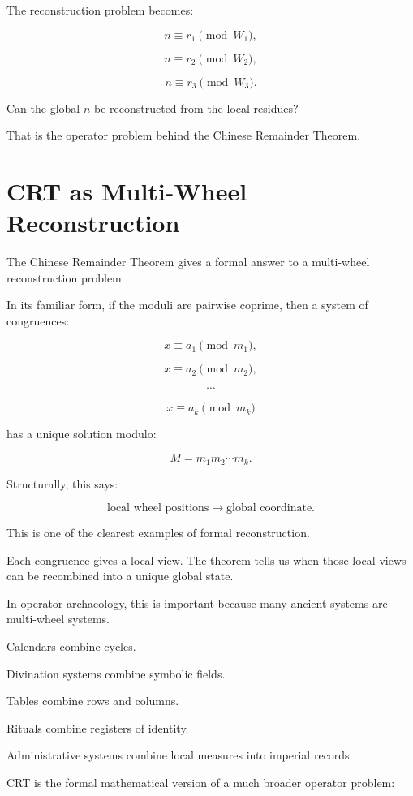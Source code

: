 \documentclass[11pt]{book}
\begin{document}
The reconstruction problem becomes:

\[
n \equiv r_1 \pmod{W_1},
\]

\[
n \equiv r_2 \pmod{W_2},
\]

\[
n \equiv r_3 \pmod{W_3}.
\]

Can the global \(n\) be reconstructed from the local residues?

That is the operator problem behind the Chinese Remainder Theorem.

\section{CRT as Multi-Wheel Reconstruction}

The Chinese Remainder Theorem gives a formal answer to a multi-wheel reconstruction problem \cite{HardyWright2008NumberTheory,Needham1959ScienceCivilisationChina3}.

In its familiar form, if the moduli are pairwise coprime, then a system of congruences:

\[
x \equiv a_1 \pmod{m_1},
\]

\[
x \equiv a_2 \pmod{m_2},
\]

\[
\cdots
\]

\[
x \equiv a_k \pmod{m_k}
\]

has a unique solution modulo:

\[
M = m_1m_2\cdots m_k.
\]

Structurally, this says:

\[
\text{local wheel positions} \rightarrow \text{global coordinate}.
\]

This is one of the clearest examples of formal reconstruction.

Each congruence gives a local view. The theorem tells us when those local views can be recombined into a unique global state.

In operator archaeology, this is important because many ancient systems are multi-wheel systems.

Calendars combine cycles.

Divination systems combine symbolic fields.

Tables combine rows and columns.

Rituals combine registers of identity.

Administrative systems combine local measures into imperial records.

CRT is the formal mathematical version of a much broader operator problem:
\end{document}
